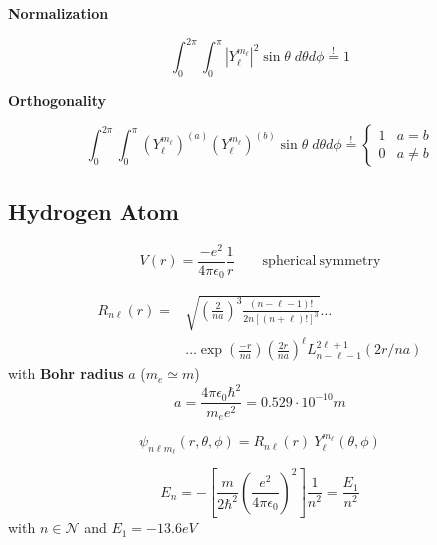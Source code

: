 \textbf{Normalization}

\noindent\begin{equation*}
    \int_0^{2\pi}\int_0^{\pi} |Y_\ell^{m_\ell}|^2 \sin\theta\;d\theta d\phi \overset{!}{=} 1
\end{equation*}

\textbf{Orthogonality}

\noindent\begin{equation*}
    \int_0^{2\pi}\int_0^{\pi} {(Y_\ell^{m_\ell})}^{(a)}{(Y_\ell^{m_\ell})}^{(b)} \sin\theta\;d\theta d\phi \overset{!}{=} \begin{cases}
        1 & a=b     \\
        0 & a\neq b
    \end{cases}
\end{equation*}

\subsection{Hydrogen Atom}
\noindent\begin{equation*}
    V(r) = \frac{-e^2}{4\pi\epsilon_0}\frac{1}{r}\qquad \mathrm{spherical\ symmetry}
\end{equation*}

\begin{align*}
    R_{n\ell}(r) = & \sqrt{{\left(\frac{2}{na}\right)}^3\frac{(n-\ell-1)!}{2n{[(n+\ell)!]}^3}} \ldots                    \\
                   & \ldots\exp\left(\frac{-r}{na}\right){\left(\frac{2r}{na}\right)}^\ell L_{n-\ell-1}^{2\ell+1}(2r/na)
\end{align*}
with \textbf{Bohr radius} $a$ ($m_e\simeq m$)
\begin{equation*}
    a = \frac{4\pi\epsilon_0\hbar^2}{m_e e^2}=0.529 \cdot 10^{-10}m
\end{equation*}

\begin{equation*}
    \psi_{n\ell m_\ell}(r,\theta,\phi) = R_{n\ell}(r)\:Y_\ell^{m_\ell}(\theta, \phi)
\end{equation*}


\begin{equation*}
    E_n = -\left[\frac{m}{2\hbar^2}{\left(\frac{e^2}{4\pi\epsilon_0}\right)}^2\right]\frac{1}{n^2} = \frac{E_1}{n^2}
\end{equation*}
with $n \in \mathcal{N}$ and $E_1 = -13.6eV$

